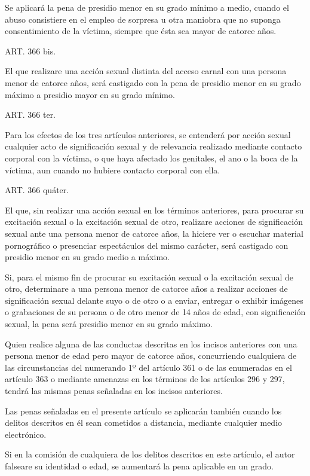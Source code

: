     Se aplicará la pena de presidio menor en su grado mínimo a medio, cuando el abuso consistiere en el empleo de sorpresa u otra maniobra que no suponga consentimiento de la víctima, siempre que ésta sea mayor de catorce años.

    ART. 366 bis.

    El que realizare una acción sexual distinta del acceso carnal con una persona menor de catorce años, será castigado con la pena de presidio menor en su grado máximo a presidio mayor en su grado mínimo.

    ART. 366 ter.


    Para los efectos de los tres artículos anteriores, se entenderá por acción sexual cualquier acto de significación sexual y de relevancia realizado mediante contacto corporal con la víctima, o que haya afectado los genitales, el ano o la boca de la víctima, aun cuando no hubiere contacto corporal con ella.

    ART. 366 quáter.

    El que, sin realizar una acción sexual en los términos anteriores, para procurar su excitación sexual o la excitación sexual de otro, realizare acciones de significación sexual ante una persona menor de catorce años, la hiciere ver o escuchar material pornográfico o presenciar espectáculos del mismo carácter, será castigado con presidio menor en su grado medio a máximo.

    Si, para el mismo fin de procurar su excitación sexual o la excitación sexual de otro, determinare a una persona menor de catorce años a realizar acciones de significación sexual delante suyo o de otro o a enviar, entregar o exhibir imágenes o grabaciones de su persona o de otro menor de 14 años de edad, con significación sexual, la pena será presidio menor en su grado máximo.

    Quien realice alguna de las conductas descritas en los incisos anteriores con una persona menor de edad pero mayor de catorce años, concurriendo cualquiera de las circunstancias del numerando 1º del artículo 361 o de las enumeradas en el artículo 363 o mediante amenazas en los términos de los artículos 296 y 297, tendrá las mismas penas señaladas en los incisos anteriores.

    Las penas señaladas en el presente artículo se aplicarán también cuando los delitos descritos en él sean cometidos a distancia, mediante cualquier medio electrónico.

    Si en la comisión de cualquiera de los delitos descritos en este artículo, el autor falseare su identidad o edad, se aumentará la pena aplicable en un grado.

